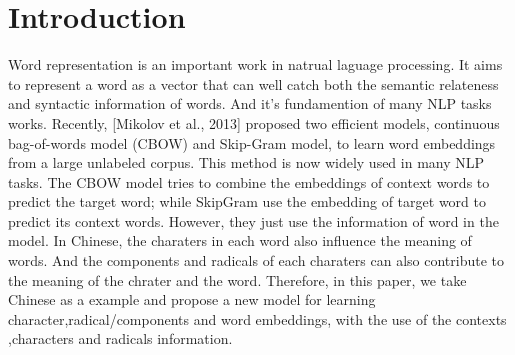\section{Introduction}
Word representation is an important work in natrual laguage processing. It aims to represent a word as a vector that can well catch both the semantic relateness and syntactic information of words. And it's fundamention of many NLP tasks works. 
Recently, [Mikolov et al., 2013] proposed two efficient models, continuous bag-of-words model (CBOW) and Skip-Gram model, to learn word embeddings from a large unlabeled corpus. This method is now widely used in many NLP tasks. The CBOW model tries to combine the embeddings of context words to predict the target word; while SkipGram use the embedding of target word to predict its context words. 
However, they just use the information of word in the model. In Chinese, the charaters in each word also influence the meaning of words. And the components and radicals of each charaters can also contribute to the meaning of the chrater and the word. Therefore, in this paper, we take Chinese as a example and propose a new model for learning character,radical/components and word embeddings, with the use of the contexts ,characters and radicals information.